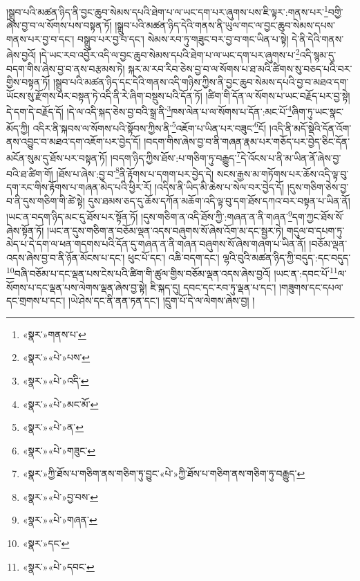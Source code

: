 །སྒྲུབ་པའི་མཚན་ཉིད་ནི་བྱང་ཆུབ་སེམས་དཔའི་ཐེག་པ་ལ་ཡང་དག་པར་ཞུགས་པས་ཇི་ལྟར་:གནས་པར་\footnote{«སྣར་»གནས་པ་}བགྱི་ཞེས་བྱ་བ་ལ་སོགས་པས་བསྟན་ཏོ། །སྒྲུབ་པའི་མཚན་ཉིད་དེའི་གནས་ནི་ཡུལ་གང་ལ་བྱང་ཆུབ་སེམས་དཔས་གནས་པར་བྱ་བ་དང་། བསྒྲུབ་པར་བྱ་བ་དང་། སེམས་རབ་ཏུ་གཟུང་བར་བྱ་བ་གང་ཡིན་པ་སྟེ། དེ་ནི་དེའི་གནས་ཞེས་བྱའོ། །དེ་ཡང་རབ་འབྱོར་འདི་ལ་བྱང་ཆུབ་སེམས་དཔའི་ཐེག་པ་ལ་ཡང་དག་པར་ཞུགས་པ་\footnote{«སྣར་»«པེ་»པས་}འདི་སྙམ་དུ་བདག་གིས་ཞེས་བྱ་བ་ནས་བརྩམས་ཏེ། སྐར་མ་རབ་རིབ་ཅེས་བྱ་བ་ལ་སོགས་པ་ཐ་མའི་ཚིགས་སུ་བཅད་པའི་བར་གྱིས་བསྟན་ཏོ། །སྒྲུབ་པའི་མཚན་ཉིད་དང་དེའི་གནས་འདི་གཉིས་ཀྱིས་ནི་བྱང་ཆུབ་སེམས་དཔའི་བྱ་བ་མཐའ་དག་ཡོངས་སུ་རྫོགས་པར་བསྟན་ཏེ་འདི་ནི་རེ་ཞིག་བསྡུས་པའི་དོན་ཏོ། །ཚིག་གི་དོན་ལ་སོགས་པ་ཡང་བརྗོད་པར་བྱ་སྟེ། དེ་དག་དེ་བརྗོད་དོ། །དེ་ལ་འདི་སྐད་ཅེས་བྱ་བའི་སྒྲ་ནི་\footnote{«སྣར་»«པེ་»འདི་}ཁས་ལེན་པ་ལ་སོགས་པ་དོན་:མང་པོ་\footnote{«སྣར་»«པེ་»མང་མོ་}ཞིག་ཏུ་ཡང་སྣང་མོད་ཀྱི། འདིར་ནི་སྐབས་ལ་སོགས་པའི་སྟོབས་ཀྱིས་ནི་\footnote{«སྣར་»«པེ་»ན་}འཇོག་པ་ཡིན་པར་བཟུང་\footnote{«སྣར་»«པེ་»གཟུང་}ངོ། །འདི་ནི་མདོ་སྡེའི་དོན་འོག་ནས་འབྱུང་བ་མཐའ་དག་འཇོག་པར་བྱེད་དོ། །བདག་གིས་ཞེས་བྱ་བ་ནི་གཞན་རྣམ་པར་གཅོད་པར་བྱེད་ཅིང་དོན་མངོན་སུམ་དུ་ཐོས་པར་བསྟན་ཏོ། །བདག་ཉིད་ཀྱིས་ཐོས་:པ་གཅིག་ཏུ་བརྒྱུད་\footnote{«སྣར་»ཀྱི་ཐོས་པ་གཅིག་ནས་གཅིག་ཏུ་བྱུང་«པེ་»ཀྱི་ཐོས་པ་གཅིག་ནས་གཅིག་ཏུ་བརྒྱུད་}དེ་འོངས་པ་ནི་མ་ཡིན་ནོ་ཞེས་བྱ་བའི་ཐ་ཚིག་གོ། །ཐོས་པ་ཞེས་:བྱ་བ་\footnote{«སྣར་»«པེ་»བྱ་བས་}ནི་རྟོགས་པ་དགག་པར་བྱེད་དེ། སངས་རྒྱས་མ་གཏོགས་པར་ཆོས་འདི་ལྟ་བུ་དག་རང་གིས་རྟོགས་པ་གཞན་མེད་པའི་ཕྱིར་རོ། །འདིས་ནི་ཡིད་མི་ཆེས་པ་སེལ་བར་བྱེད་དོ། །དུས་གཅིག་ཅེས་བྱ་བ་ནི་དུས་གཅིག་གི་ཚེ་སྟེ། དུས་ཐམས་ཅད་དུ་ཆོས་དཀོན་མཆོག་འདི་ལྟ་བུ་དག་ཐོས་དཀའ་བར་བསྟན་པ་ཡིན་ནོ། །ཡང་ན་བདག་ཉིད་མང་དུ་ཐོས་པར་སྟོན་ཏོ། །དུས་གཅིག་ན་འདི་ཐོས་ཀྱི་:གཞན་ན་ནི་གཞན་\footnote{«སྣར་»«པེ་»གཞན་}དག་ཀྱང་ཐོས་སོ་ཞེས་སྟོན་ཏོ། །ཡང་ན་དུས་གཅིག་ན་བཅོམ་ལྡན་འདས་བཞུགས་སོ་ཞེས་འོག་མ་དང་སྦྱར་ཏེ། གདུལ་བ་དཔག་ཏུ་མེད་པ་དེ་དག་ལ་ཕན་གདགས་པའི་དོན་དུ་གཞན་ན་ནི་གཞན་བཞུགས་སོ་ཞེས་གཞག་པ་ཡིན་ནོ། །བཅོམ་ལྡན་འདས་ཞེས་བྱ་བ་ནི་ཉོན་མོངས་པ་དང་། ཕུང་པོ་དང་། འཆི་བདག་དང་། ལྷའི་བུའི་མཚན་ཉིད་ཀྱི་བདུད་:དང་བདུད་\footnote{«སྣར་»དང་}བཞི་བཅོམ་པ་དང་ལྡན་པས་ངེས་པའི་ཚིག་གི་ཚུལ་གྱིས་བཅོམ་ལྡན་འདས་ཞེས་བྱའོ། །ཡང་ན་:དབང་པོ་\footnote{«སྣར་»«པེ་»དབང་}ལ་སོགས་པ་དང་ལྡན་པས་ལེགས་ལྡན་ཞེས་བྱ་སྟེ། ཇི་སྐད་དུ། དབང་དང་རབ་ཏུ་ལྡན་པ་དང་། །གཟུགས་དང་དཔལ་དང་གྲགས་པ་དང་། །ཡེ་ཤེས་དང་ནི་ནན་ཏན་དང་། །དྲུག་པོ་དེ་ལ་ལེགས་ཞེས་བྱ། །
